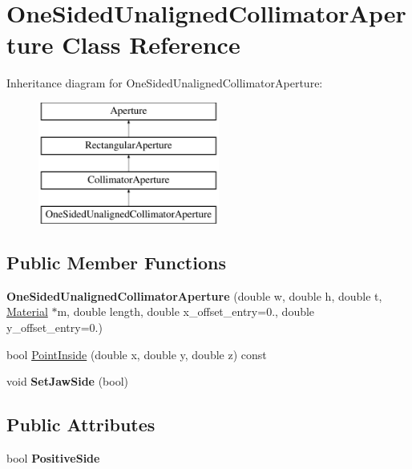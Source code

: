 \hypertarget{classOneSidedUnalignedCollimatorAperture}{}\section{One\+Sided\+Unaligned\+Collimator\+Aperture Class Reference}
\label{classOneSidedUnalignedCollimatorAperture}
Inheritance diagram for One\+Sided\+Unaligned\+Collimator\+Aperture\+:\begin{figure}[H]
\begin{center}
\leavevmode
\includegraphics[height=4.000000cm]{classOneSidedUnalignedCollimatorAperture}
\end{center}
\end{figure}
\subsection*{Public Member Functions}
\begin{DoxyCompactItemize}
\item 
\mbox{\label{classOneSidedUnalignedCollimatorAperture_a7840a2f092583cdeeb3131f9257a2608}} 
{\bfseries One\+Sided\+Unaligned\+Collimator\+Aperture} (double w, double h, double t, \hyperlink{classMaterial}{Material} $\ast$m, double length, double x\+\_\+offset\+\_\+entry=0., double y\+\_\+offset\+\_\+entry=0.)
\item 
bool \hyperlink{classOneSidedUnalignedCollimatorAperture_afad818345b971dffa9ca6fa36a166e35}{Point\+Inside} (double x, double y, double z) const
\item 
\mbox{\label{classOneSidedUnalignedCollimatorAperture_ab1b960f8484f250662ff605c5852226e}} 
void {\bfseries Set\+Jaw\+Side} (bool)
\end{DoxyCompactItemize}
\subsection*{Public Attributes}
\begin{DoxyCompactItemize}
\item 
\mbox{\label{classOneSidedUnalignedCollimatorAperture_aeb036403f8735d94007b1a9d3b5f0ae5}} 
bool {\bfseries Positive\+Side}
\end{DoxyCompactItemize}
